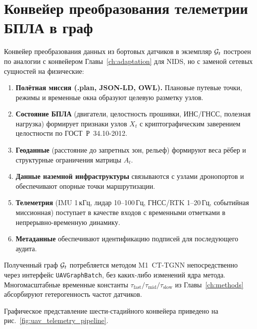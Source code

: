 \section{Конвейер преобразования телеметрии БПЛА в граф}
\label{sec:uav_pipeline}

Конвейер преобразования данных из бортовых датчиков в экземпляр
$\mathcal{G}_t$ построен по аналогии с конвейером Главы~\ref{ch:adaptation}
для NIDS, но с заменой сетевых сущностей на физические:

\begin{enumerate}\setlength\itemsep{0.15em}
\item \textbf{Полётная миссия (.plan, JSON-LD, OWL).} Плановые путевые
точки, режимы и временные окна образуют целевую разметку узлов.
\item \textbf{Состояние БПЛА} (двигатели, целостность прошивки,
ИНС/ГНСС, полезная нагрузка) формирует признаки узлов $X_t$ с
криптографическим заверением целостности по \mbox{ГОСТ~Р~34.10-2012}.
\item \textbf{Геоданные} (расстояние до запретных зон, рельеф)
формируют веса рёбер и структурные ограничения матрицы $A_t$.
\item \textbf{Данные наземной инфраструктуры} связываются с узлами
дронопортов и обеспечивают опорные точки маршрутизации.
\item \textbf{Телеметрия} (IMU 1\,кГц, лидар 10--100\,Гц, ГНСС/RTK
1--20\,Гц, событийная миссионная) поступает в качестве входов с
временными отметками в непрерывно-временную динамику.
\item \textbf{Метаданные} обеспечивают идентификацию подписей для
последующего аудита.
\end{enumerate}

Полученный граф $\mathcal{G}_t$ потребляется методом \textsf{M1~CT-TGNN}
непосредственно через интерфейс \texttt{UAVGraphBatch}, без
каких-либо изменений ядра метода. Многомасштабные временные константы
$\tau_{\mathrm{fast}}/\tau_{\mathrm{mid}}/\tau_{\mathrm{slow}}$ из
Главы~\ref{ch:methods} абсорбируют гетерогенность частот датчиков.

Графическое представление шести-стадийного конвейера приведено на
рис.~\ref{fig:uav_telemetry_pipeline}.

